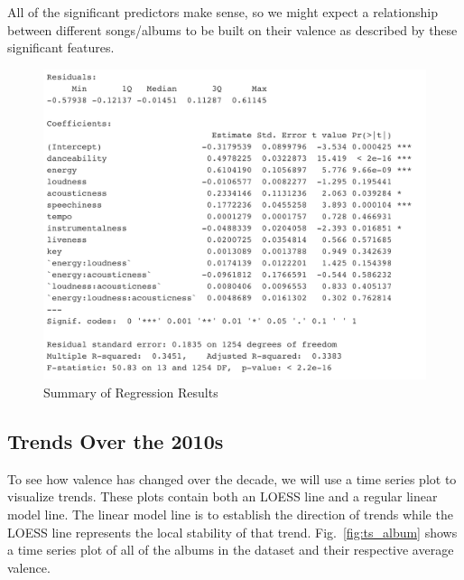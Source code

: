 \documentclass[conference]{IEEEtran}
\begin{document}
All of the significant predictors make sense, so we might expect a relationship between different songs/albums to be built on their valence as described by these significant features. 

\begin{figure}
\centerline{\includegraphics[width = \columnwidth]{spotify-images/regression}}
\caption{Summary of Regression Results}
\label{fig:regress}
\end{figure}

\subsection{Trends Over the 2010s}

To see how valence has changed over the decade, we will use a time series plot to visualize trends. These plots contain both an LOESS line and a regular linear model line. The linear model line is to establish the direction of trends while the LOESS line represents the local stability of that trend.   Fig.~\ref{fig:ts_album} shows a time series plot of all of the albums in the dataset and their respective average valence. 
\end{document}
